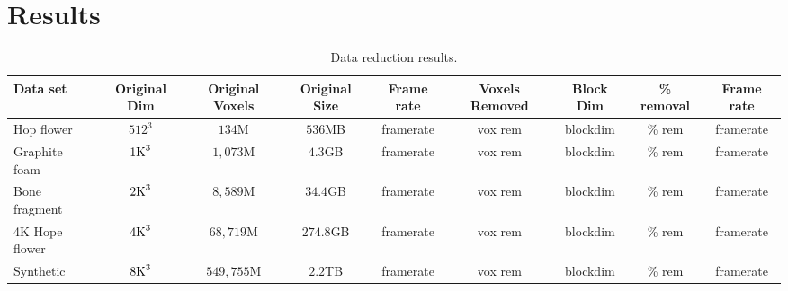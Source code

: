 \documentclass[journal]{vgtc}                %
\begin{document}
\section{Results}

\begin{table}[h]
	\caption{Data reduction results.}\label{table:dataReduction}
	\scriptsize
	
\begin{center}
	
	\begin{tabular}{lcccc|cccc}
		\textbf{Data set} & \textbf{Original Dim}& \textbf{Original Voxels} & \textbf{Original Size}& \textbf{Frame rate} & 
			\textbf{Voxels Removed} & \textbf{Block Dim} & \textbf{\% removal} & \textbf{Frame rate}\\
		
		\hline
		
		Hop flower        & $512^3$                    &  $134$M       & $536$MB & framerate & vox rem & blockdim & \% rem & framerate \\
		Graphite foam   & $1\textnormal{K}^3$  & $1,073$M     & $4.3$GB & framerate & vox rem & blockdim & \% rem & framerate \\
		Bone fragment  & $2\textnormal{K}^3$  & $8,589$M    & $34.4$GB & framerate & vox rem  & blockdim & \% rem & framerate \\
		4K Hope flower & $4\textnormal{K}^3$  & $68,719$M   & $274.8$GB & framerate & vox rem & blockdim & \% rem & framerate \\
		Synthetic          & $8\textnormal{K}^3$  & $549,755$M & $2.2$TB & framerate & vox rem & blockdim & \% rem & framerate \\
	\end{tabular}
	
	\end{center}
	
\end{table}
\end{document}
